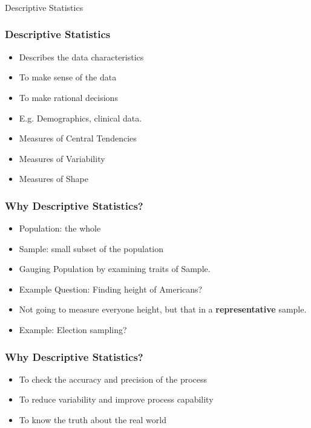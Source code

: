 \begin{frame}[fragile]\frametitle{}
\begin{center}
{\Large Descriptive Statistics}
\end{center}
\end{frame}


\begin{frame}[fragile]\frametitle{Descriptive Statistics}
\begin{itemize}
\item Describes the data characteristics
\item To make sense of the data
\item To make rational decisions
\item E.g. Demographics, clinical data.
\item Measures of Central Tendencies
\item Measures of Variability
\item Measures of Shape
\end{itemize}
\end{frame}

\begin{frame}[fragile]\frametitle{Why Descriptive Statistics?}
\begin{itemize}
\item Population: the whole
\item Sample: small subset of the population
\item Gauging Population by examining traits of Sample.
\item Example Question: Finding height of Americans?
\item Not going to measure everyone height, but that in a {\bf representative} sample.
\item Example: Election sampling?
\end{itemize}
\end{frame}



\begin{frame}[fragile]\frametitle{Why Descriptive Statistics?}
\begin{itemize}
\item To check the accuracy and precision of the process
\item To reduce variability and improve process capability
\item To know the truth about the real world
\end{itemize}
\end{frame}



